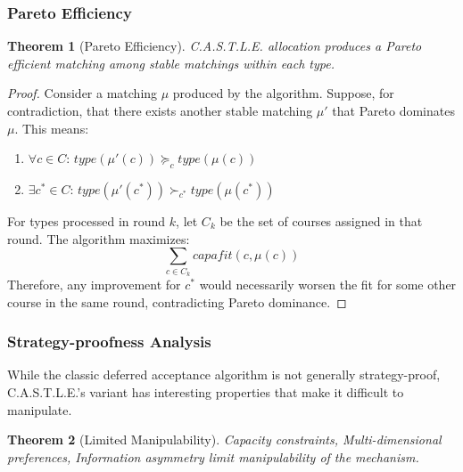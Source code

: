 \documentclass[a4paper, oneside]{article}
\theoremstyle{plain}
\newtheorem{theorem}{Theorem}
\newcommand{\castle}{C{\small.}A{\small.}S{\small.}T{\small.}L{\small.}E{\small.}}
\begin{document}
\subsubsection{Pareto Efficiency}
\begin{theorem}[Pareto Efficiency]
\castle{} allocation produces a Pareto efficient matching among stable matchings within each type.
\end{theorem}

\begin{proof}
Consider a matching $\mu$ produced by the algorithm. Suppose, for contradiction, that there exists another stable matching $\mu'$ that Pareto dominates $\mu$.
This means:
\begin{enumerate}
    \item $\forall c \in C$: $type(\mu'(c)) \succeq_c type(\mu(c))$
    \item $\exists c^* \in C$: $type(\mu'(c^*)) \succ_{c^*} type(\mu(c^*))$
\end{enumerate}
For types processed in round $k$, let $C_k$ be the set of courses assigned in that round. The algorithm maximizes:
$$\sum_{c \in C_k} capafit(c, \mu(c))$$
Therefore, any improvement for $c^*$ would necessarily worsen the fit for some other course in the same round, contradicting Pareto dominance.
\end{proof}

\subsubsection{Strategy-proofness Analysis}

While the classic deferred acceptance algorithm is not generally strategy-proof, \castle{}'s variant has interesting properties that make it difficult to manipulate.
\begin{theorem}[Limited Manipulability]
Capacity constraints, Multi-dimensional preferences, Information asymmetry limit manipulability of the mechanism.
\end{theorem}
\end{document}

